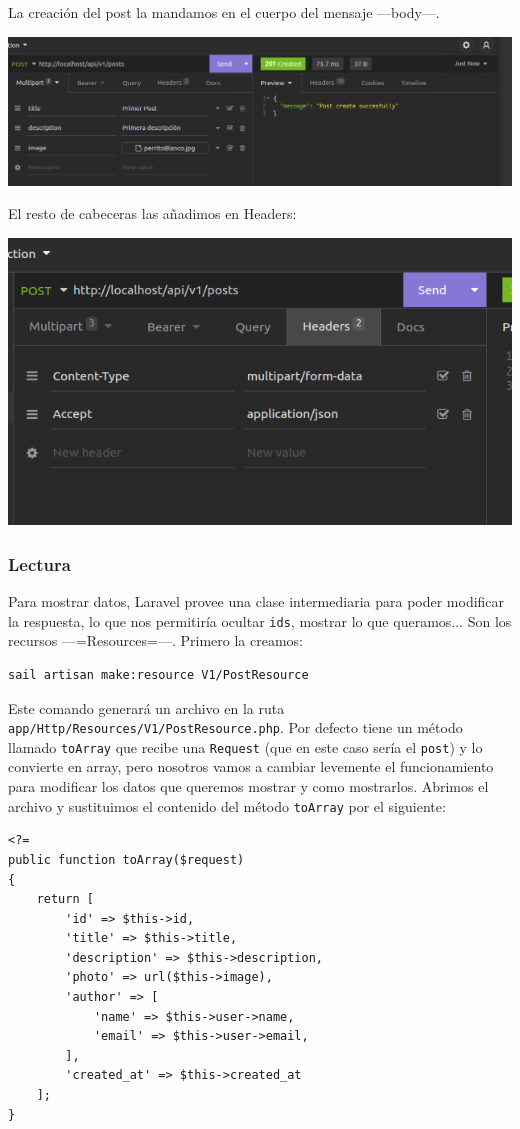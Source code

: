 \documentclass[11pt]{article}
\begin{document}
La creación del post la mandamos en el cuerpo del mensaje —body—.

\begin{center}
\includegraphics[width=.9\linewidth]{PrimerPost.png}
\end{center}

El resto de cabeceras las añadimos en Headers:

\begin{center}
\includegraphics[width=.9\linewidth]{RestoCabeceras.png}
\end{center}


\subsubsection{Lectura}
\label{sec:orge97b9bf}
Para mostrar datos, Laravel provee una clase intermediaria para poder
modificar la respuesta, lo que nos permitiría ocultar \texttt{ids}, mostrar lo
que queramos... Son los recursos —=Resources=—. Primero la creamos:
\begin{verbatim}
sail artisan make:resource V1/PostResource
\end{verbatim}

Este comando generará un archivo en la ruta
\texttt{app/Http/Resources/V1/PostResource.php}. Por defecto tiene un método
llamado \texttt{toArray} que recibe una \texttt{Request} (que en este caso sería el
\texttt{post}) y lo convierte en array, pero nosotros vamos a cambiar levemente
el funcionamiento para modificar los datos que queremos mostrar y como
mostrarlos. Abrimos el archivo y sustituimos el contenido del método
\texttt{toArray} por el siguiente:
\begin{verbatim}
<?=
public function toArray($request)
{
    return [
        'id' => $this->id,
        'title' => $this->title,
        'description' => $this->description,
        'photo' => url($this->image),
        'author' => [
            'name' => $this->user->name,
            'email' => $this->user->email,
        ],
        'created_at' => $this->created_at
    ];
}
\end{verbatim}
\end{document}
